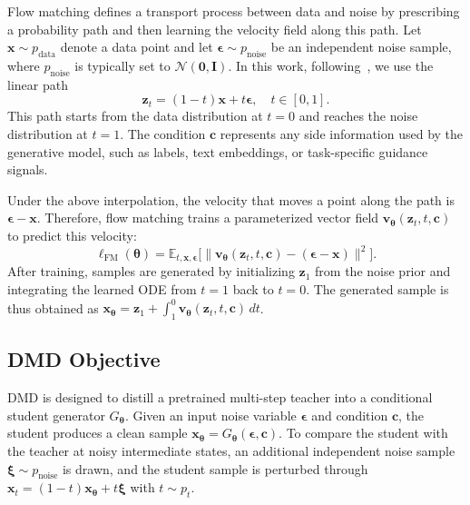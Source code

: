 \documentclass{llmxive}
\providecommand{\bm}[1]{\boldsymbol{#1}}
\begin{document}
Flow matching defines a transport process between data and noise by prescribing a probability path and then learning the velocity field along this path. Let $\bm{x}\sim p_{\text{data}}$ denote a data point and let $\bm{\epsilon}\sim p_{\text{noise}}$ be an independent noise sample, where $p_{\text{noise}}$ is typically set to $\mathcal{N}(\mathbf{0},\mathbf{I})$. In this work, following~\citep{liu2023flow, geng2025mean}, we use the linear path
\begin{equation}
\bm{z}_t = (1-t)\bm{x} + t\bm{\epsilon}, \quad t\in[0,1].
\end{equation}
This path starts from the data distribution at $t=0$ and reaches the noise distribution at $t=1$. The condition $\bm c$ represents any side information used by the generative model, such as labels, text embeddings, or task-specific guidance signals.

Under the above interpolation, the velocity that moves a point along the path is
$\bm{\epsilon}-\bm{x}$. Therefore, flow matching trains a parameterized vector field
$\bm{v}_{\bm\theta}(\bm{z}_t,t,\bm c)$ to predict this velocity:
\begin{equation}
\ell_{\text{FM}}(\bm\theta) =
\mathbb{E}_{t,\bm{x},\bm{\epsilon}}
\Big[
\big\|
\bm{v}_{\bm\theta}(\bm{z}_t,t,\bm{c})-(\bm{\epsilon}-\bm{x})
\big\|^2
\Big].
\label{eq:fm_loss}
\end{equation}
After training, samples are generated by initializing $\bm{z}_1$ from the noise prior and integrating the learned ODE from $t=1$ back to $t=0$. The generated sample is thus obtained as
$\bm{x}_{\bm\theta}=\bm{z}_1+\int_{1}^{0}\bm{v}_{\bm\theta}(\bm{z}_t,t,\bm c)\,dt$.

\subsection{DMD Objective}

DMD is designed to distill a pretrained multi-step teacher into a conditional student generator $G_{\bm\theta}$. Given an input noise variable $\bm{\epsilon}$ and condition $\bm c$, the student produces a clean sample
$\bm{x}_{\bm\theta}=G_{\bm\theta}(\bm{\epsilon},\bm c)$. To compare the student with the teacher at noisy intermediate states, an additional independent noise sample $\bm{\xi}\sim p_{\text{noise}}$ is drawn, and the student sample is perturbed through
$\bm{x}_t=(1-t)\bm{x}_{\bm\theta}+t\bm{\xi}$ with $t\sim p_t$.
\end{document}
